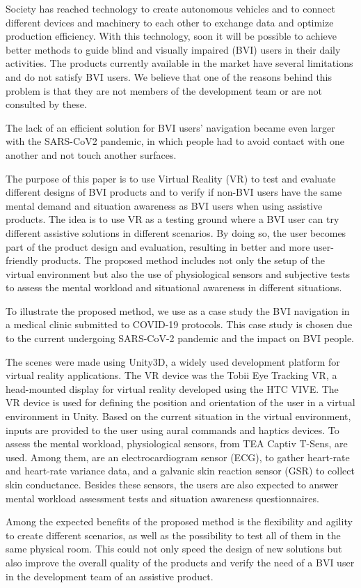 
Society has reached technology to create autonomous vehicles and to connect different devices and machinery to each other to exchange data and optimize production efficiency.  With this technology, soon it will be possible to achieve better methods to guide blind and visually impaired (BVI) users in their daily activities. The products currently available in the market have several limitations and do not satisfy BVI users. We believe that one of the reasons behind this problem is that they are not members of the development team or are not consulted by these. 

The lack of an efficient solution for BVI users' navigation became even larger with the SARS-CoV2 pandemic, in which people had to avoid contact with one another and not touch another surfaces.

The purpose of this paper is to use Virtual Reality (VR) to test and evaluate different designs of BVI products and to verify if non-BVI users have the same mental demand and situation awareness as BVI users when using assistive products. The idea is to use VR as a testing ground where a BVI user can try different assistive solutions in different scenarios. By doing so, the user becomes part of the product design and evaluation, resulting in better and more user-friendly products. The proposed method includes not only the setup of the virtual environment but also the use of physiological sensors and subjective tests to assess the mental workload and situational awareness in different situations.

To illustrate the proposed method, we use as a case study the BVI navigation in a medical clinic submitted to COVID-19 protocols. This case study is chosen due to the current undergoing SARS-CoV-2 pandemic and the impact on BVI people.

The scenes were made using Unity3D, a widely used development platform for virtual reality applications. The VR device was the Tobii Eye Tracking VR, a head-mounted display for virtual reality developed using the HTC VIVE. The VR device is used for defining the position and orientation of the user in a virtual environment in Unity. Based on the current situation in the virtual environment, inputs are provided to the user using aural commands and haptics devices. To assess the mental workload, physiological sensors, from TEA Captiv T-Sens, are used. Among them, are an electrocardiogram sensor (ECG), to gather heart-rate and heart-rate variance data, and a galvanic skin reaction sensor (GSR) to collect skin conductance. Besides these sensors, the users are also expected to answer mental workload assessment tests and situation awareness questionnaires.

Among the expected benefits of the proposed method is the flexibility and agility to create different scenarios, as well as the possibility to test all of them in the same physical room. This could not only speed the design of new solutions but also improve the overall quality of the products and verify the need of a BVI user in the development team of an assistive product.